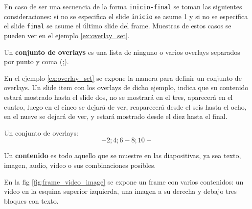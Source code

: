  		En caso de ser una secuencia de la forma \texttt{inicio-final} se toman las siguientes consideraciones: si no se especifica el slide \texttt{inicio} se asume 1 y si no se especifica el slide \texttt{final} se asume el último slide del frame. Muestras de estos casos se pueden ver en el ejemplo \ref{ex:overlay_set}. 		

 		\begin{definition}
 		\label{def:ovaerlay_set}
 			Un \textbf{conjunto de overlays} es una lista de ninguno o varios overlays separados por punto y coma (;).
 		\end{definition} 


		En el ejemplo \ref{ex:overlay_set} se expone la manera para definir un conjunto de overlays. Un slide item con los overlays de dicho ejemplo, indica que su contenido estará mostrado hasta el slide dos, no se mostrará en el tres, aparecerá en el cuatro, luego en el cinco se dejará de ver, reaparecerá desde el seis hasta el ocho, en el nueve se dejará de ver, y estará mostrado desde el diez hasta el final.  	

 		\begin{example}
 		\label{ex:overlay_set}
 			Un conjunto de overlays:
 			$$-2; 4; 6-8; 10-$$
 		\end{example}	

					

		\begin{definition}
		\label{def:content}
			Un \textbf{contenido} es todo aquello que se muestre en las diapositivas, ya sea texto, imagen, audio, video o sus combinaciones posibles. 
		\end{definition}


		En la fig \ref{fig:frame_video_image} se expone un frame con varios contenidos: un video en la esquina superior izquierda, una imagen a su derecha y debajo tres bloques con texto.


